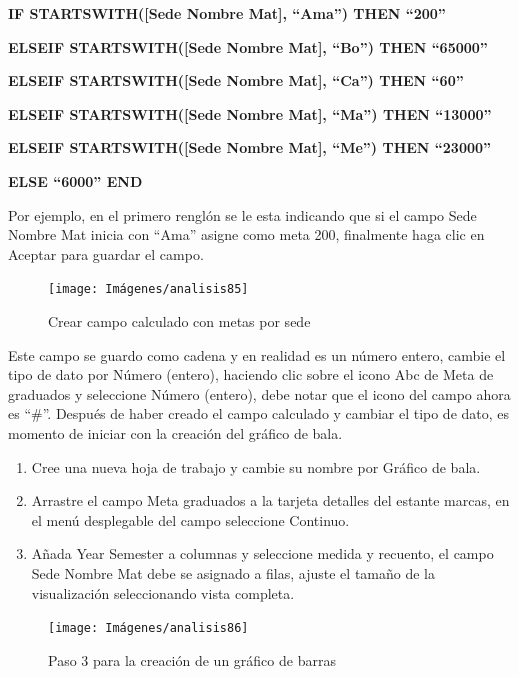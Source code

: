 \documentclass[
]{book}
\begin{document}
\textbf{IF STARTSWITH({[}Sede Nombre Mat{]}, ``Ama'') THEN ``200'' }

\textbf{ELSEIF STARTSWITH({[}Sede Nombre Mat{]}, ``Bo'') THEN ``65000''}

\textbf{ELSEIF STARTSWITH({[}Sede Nombre Mat{]}, ``Ca'') THEN ``60''}

\textbf{ELSEIF STARTSWITH({[}Sede Nombre Mat{]}, ``Ma'') THEN ``13000''}

\textbf{ELSEIF STARTSWITH({[}Sede Nombre Mat{]}, ``Me'') THEN ``23000''}

\textbf{ELSE ``6000'' END}

Por ejemplo, en el primero renglón se le esta indicando que si el campo Sede Nombre Mat inicia con ``Ama'' asigne como meta 200, finalmente haga clic en Aceptar para guardar el campo.

\begin{figure}

{\centering \texttt{[image: Imágenes/analisis85]} 

}

\caption{Crear campo calculado con metas por sede}\label{fig:campocalculadometas-fig}
\end{figure}

Este campo se guardo como cadena y en realidad es un número entero, cambie el tipo de dato por Número (entero), haciendo clic sobre el icono Abc de Meta de graduados y seleccione Número (entero), debe notar que el icono del campo ahora es ``\#''. Después de haber creado el campo calculado y cambiar el tipo de dato, es momento de iniciar con la creación del gráfico de bala.

\begin{enumerate}
\def\labelenumi{\arabic{enumi}.}
\item
  Cree una nueva hoja de trabajo y cambie su nombre por Gráfico de bala.
\item
  Arrastre el campo Meta graduados a la tarjeta detalles del estante marcas, en el menú desplegable del campo seleccione Continuo.
\item
  Añada Year Semester a columnas y seleccione medida y recuento, el campo Sede Nombre Mat debe se asignado a filas, ajuste el tamaño de la visualización seleccionando vista completa.
\end{enumerate}

\begin{figure}

{\centering \texttt{[image: Imágenes/analisis86]} 

}

\caption{Paso 3 para la creación de un gráfico de barras}\label{fig:paso3graficobala-fig}
\end{figure}
\end{document}
